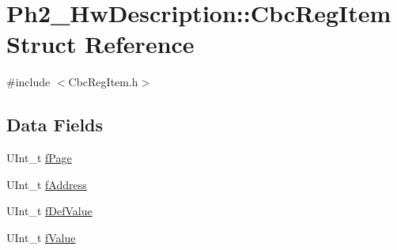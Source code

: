 \hypertarget{struct_ph2___hw_description_1_1_cbc_reg_item}{\section{Ph2\-\_\-\-Hw\-Description\-:\-:Cbc\-Reg\-Item Struct Reference}
\label{struct_ph2___hw_description_1_1_cbc_reg_item}
}


{\ttfamily \#include $<$Cbc\-Reg\-Item.\-h$>$}

\subsection*{Data Fields}
\begin{DoxyCompactItemize}
\item 
U\-Int\-\_\-t \hyperlink{struct_ph2___hw_description_1_1_cbc_reg_item_a068f75bd0c65172b6ebb413f3508b818}{f\-Page}
\item 
U\-Int\-\_\-t \hyperlink{struct_ph2___hw_description_1_1_cbc_reg_item_a2951ae4efa316ed997e28c54a0e786de}{f\-Address}
\item 
U\-Int\-\_\-t \hyperlink{struct_ph2___hw_description_1_1_cbc_reg_item_a80499ef154b03c99b1a5e0eb364ec5b6}{f\-Def\-Value}
\item 
U\-Int\-\_\-t \hyperlink{struct_ph2___hw_description_1_1_cbc_reg_item_a9571d808e85f74e23fc55bf06a1c803e}{f\-Value}
\end{DoxyCompactItemize}


